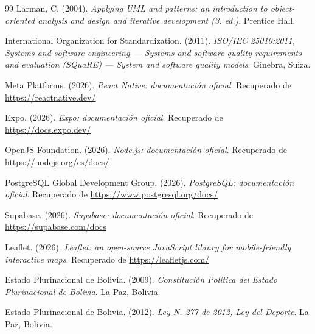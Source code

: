 \documentclass[12pt,letterpaper]{article}
\begin{document}
\begin{thebibliography}{99}
Larman, C. (2004). \textit{Applying UML and patterns: an introduction to object-oriented analysis and design and iterative development (3.{\textordfeminine} ed.)}. Prentice Hall.

International Organization for Standardization. (2011). \textit{ISO/IEC 25010:2011, Systems and software engineering --- Systems and software quality requirements and evaluation (SQuaRE) --- System and software quality models}. Ginebra, Suiza.

Meta Platforms. (2026). \textit{React Native: documentaci\'on oficial}. Recuperado de \url{https://reactnative.dev/}

Expo. (2026). \textit{Expo: documentaci\'on oficial}. Recuperado de \url{https://docs.expo.dev/}

OpenJS Foundation. (2026). \textit{Node.js: documentaci\'on oficial}. Recuperado de \url{https://nodejs.org/es/docs/}

PostgreSQL Global Development Group. (2026). \textit{PostgreSQL: documentaci\'on oficial}. Recuperado de \url{https://www.postgresql.org/docs/}

Supabase. (2026). \textit{Supabase: documentaci\'on oficial}. Recuperado de \url{https://supabase.com/docs}

Leaflet. (2026). \textit{Leaflet: an open-source JavaScript library for mobile-friendly interactive maps}. Recuperado de \url{https://leafletjs.com/}

Estado Plurinacional de Bolivia. (2009). \textit{Constituci\'on Pol\'itica del Estado Plurinacional de Bolivia}. La Paz, Bolivia.

Estado Plurinacional de Bolivia. (2012). \textit{Ley N.{\textordmasculine} 277 de 2012, Ley del Deporte}. La Paz, Bolivia.


\end{thebibliography}
\end{document}
